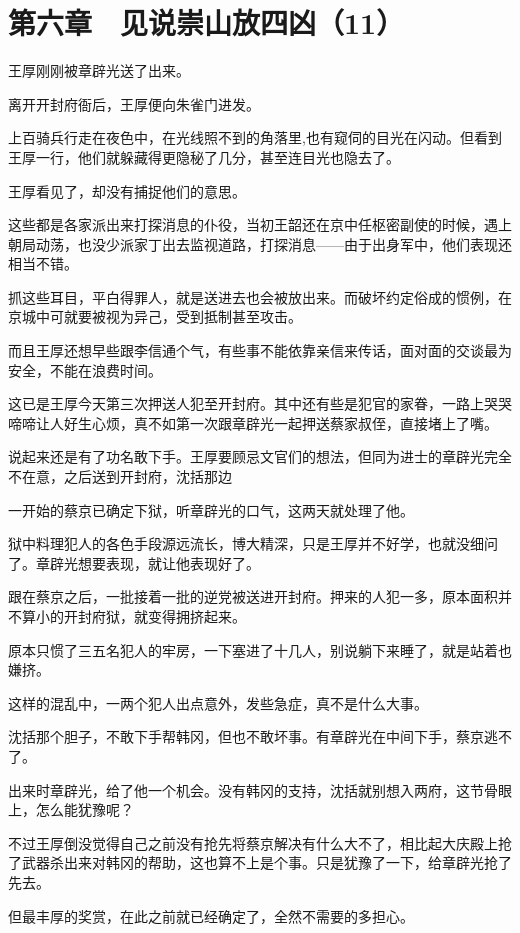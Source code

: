 \section{第六章　见说崇山放四凶（11）}

王厚刚刚被章辟光送了出来。

离开开封府衙后，王厚便向朱雀门进发。

上百骑兵行走在夜色中，在光线照不到的角落里,也有窥伺的目光在闪动。但看到王厚一行，他们就躲藏得更隐秘了几分，甚至连目光也隐去了。

王厚看见了，却没有捕捉他们的意思。

这些都是各家派出来打探消息的仆役，当初王韶还在京中任枢密副使的时候，遇上朝局动荡，也没少派家丁出去监视道路，打探消息——由于出身军中，他们表现还相当不错。

抓这些耳目，平白得罪人，就是送进去也会被放出来。而破坏约定俗成的惯例，在京城中可就要被视为异己，受到抵制甚至攻击。

而且王厚还想早些跟李信通个气，有些事不能依靠亲信来传话，面对面的交谈最为安全，不能在浪费时间。

这已是王厚今天第三次押送人犯至开封府。其中还有些是犯官的家眷，一路上哭哭啼啼让人好生心烦，真不如第一次跟章辟光一起押送蔡家叔侄，直接堵上了嘴。

说起来还是有了功名敢下手。王厚要顾忌文官们的想法，但同为进士的章辟光完全不在意，之后送到开封府，沈括那边

一开始的蔡京已确定下狱，听章辟光的口气，这两天就处理了他。

狱中料理犯人的各色手段源远流长，博大精深，只是王厚并不好学，也就没细问了。章辟光想要表现，就让他表现好了。

跟在蔡京之后，一批接着一批的逆党被送进开封府。押来的人犯一多，原本面积并不算小的开封府狱，就变得拥挤起来。

原本只惯了三五名犯人的牢房，一下塞进了十几人，别说躺下来睡了，就是站着也嫌挤。

这样的混乱中，一两个犯人出点意外，发些急症，真不是什么大事。

沈括那个胆子，不敢下手帮韩冈，但也不敢坏事。有章辟光在中间下手，蔡京逃不了。

出来时章辟光，给了他一个机会。没有韩冈的支持，沈括就别想入两府，这节骨眼上，怎么能犹豫呢？

不过王厚倒没觉得自己之前没有抢先将蔡京解决有什么大不了，相比起大庆殿上抢了武器杀出来对韩冈的帮助，这也算不上是个事。只是犹豫了一下，给章辟光抢了先去。

但最丰厚的奖赏，在此之前就已经确定了，全然不需要的多担心。

